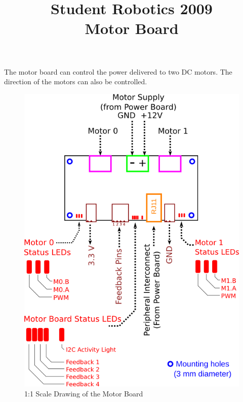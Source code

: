 \documentclass[a4paper]{article}
\title{Student Robotics 2009\\ Motor Board}
\begin{document}
\maketitle

The motor board can control the power delivered to two DC motors.  The direction of the motors can also be controlled. 

\begin{figure}
\centering
\label{fig:outline}
\includegraphics[scale=1]{outline}
\caption{1:1 Scale Drawing of the Motor Board}
\end{figure}
\end{document}
